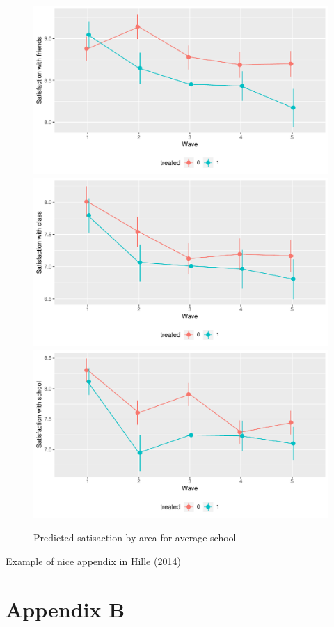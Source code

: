 \documentclass[a4, 12pt]{article}
\begin{document}
\begin{figure}[H]

{\centering \includegraphics[width=0.65\linewidth,]{../figures/sat_friends_pred} \includegraphics[width=0.65\linewidth,]{../figures/sat_class_pred} \includegraphics[width=0.65\linewidth,]{../figures/sat_school_pred} 

}

\caption{Predicted satisaction by area for average school}\label{fig:sat-pred}
\end{figure}

Example of nice appendix in Hille (2014)

\clearpage

\hypertarget{appendix-b}{%
\section{Appendix B}\label{appendix-b}}
\end{document}
